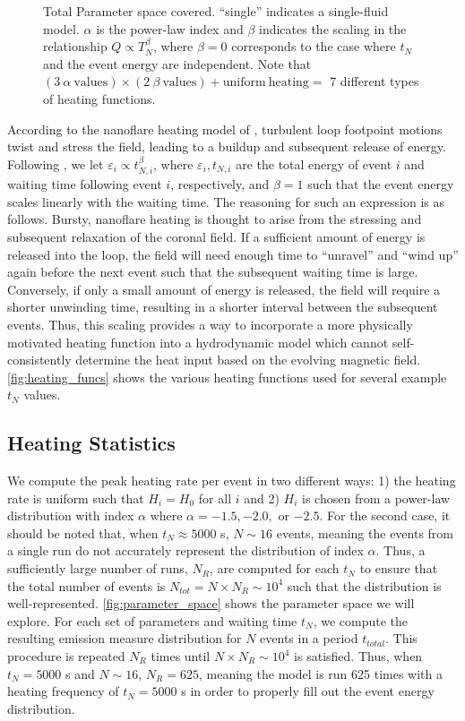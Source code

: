 \documentclass[apj]{emulateapj}
\begin{document}
	\begin{figure}
		\centering
		
		\caption{Total Parameter space covered. ``single'' indicates a single-fluid model. $\alpha$ is the power-law index and $\beta$ indicates the scaling in the relationship $Q\propto T_N^{\beta}$, where $\beta=0$ corresponds to the case where $t_N$ and the event energy are independent. Note that $(3~\alpha~\mathrm{values})\times(2~\beta~\mathrm{values})+\mathrm{uniform~heating}=$ 7 different types of heating functions.}
		\label{fig:parameter_space}
	\end{figure}
	\par According to the nanoflare heating model of \citet{parker_nanoflares_1988}, turbulent loop footpoint motions twist and stress the field, leading to a buildup and subsequent release of energy. Following \citet{cargill_active_2014}, we let $\varepsilon_i\propto t_{N,i}^{\beta}$, where $\varepsilon_i,t_{N,i}$ are the total energy of event $i$ and waiting time following event $i$, respectively, and $\beta=1$ such that the event energy scales linearly with the waiting time. The reasoning for such an expression is as follows. Bursty, nanoflare heating is thought to arise from the stressing and subsequent relaxation of the coronal field. If a sufficient amount of energy is released into the loop, the field will need enough time to ``unravel'' and ``wind up'' again before the next event such that the subsequent waiting time is large. Conversely, if only a small amount of energy is released, the field will require a shorter unwinding time, resulting in a shorter interval between the subsequent events. Thus, this scaling provides a way to incorporate a more physically motivated heating function into a hydrodynamic model which cannot self-consistently determine the heat input based on the evolving magnetic field. \autoref{fig:heating_funcs} shows the various heating functions used for several example $t_N$ values.
	\subsection{Heating Statistics}
	\label{subsec:heating_stats}
	\par We compute the peak heating rate per event in two different ways: 1) the heating rate is uniform such that $H_i=H_0$ for all $i$ and 2) $H_i$ is chosen from a power-law distribution with index $\alpha$ where $\alpha=-1.5,-2.0,$ or $-2.5$. For the second case, it should be noted that, when $t_N\approx5000$ s, $N\sim16$ events, meaning the events from a single run do not accurately represent the distribution of index $\alpha$. Thus, a sufficiently large number of runs, $N_{R}$, are computed for each $t_N$ to ensure that the total number of events is $N_{tot}=N\times N_{R}\sim10^4$ such that the distribution is well-represented. \autoref{fig:parameter_space} shows the parameter space we will explore. For each set of parameters and waiting time $t_N$, we compute the resulting emission measure distribution for $N$ events in a period $t_{total}$. This procedure is repeated $N_R$ times until $N\times N_R\sim10^4$ is satisfied. Thus, when $t_N=5000$ s and $N\sim16$, $N_R=625$, meaning the model is run 625 times with a heating frequency of $t_N=5000$ s in order to properly fill out the event energy distribution.
\end{document}
